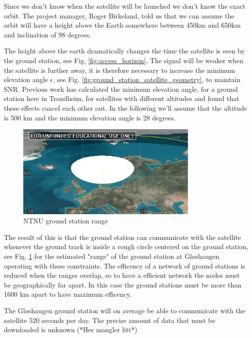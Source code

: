 Since we don't know when the satellite will be launched we don't know the exact orbit. The project manager, Roger Birkeland, told us that we can assume the orbit will  have a height above the Earth somewhere between 450km and 650km and inclination of 98 degrees.

The height above the earth dramatically changes the time the satellite is seen by the ground station, see Fig. \ref{fig:access_horizon}. The signal will be weaker when the satellite is further away, it is therefore necessary to increase the minimum elevation angle $\epsilon$, see Fig. \ref{fig:ground_station_satellite_geometry}, to maintain SNR.  Previous work\cite{antennemaster}\cite{bildemaster} has calculated the minimum elevation angle, for a ground station here in Trondheim, for satellites with different altitudes and found that these effects cancel each other out. In the following we'll assume that the altitude is 500 km and the minimum elevation angle is 28 degrees.

\begin{figure}
  \begin{center}
    \includegraphics[width=0.8\textwidth]{Figures/ntnu_footprint}
  \end{center}
  \caption[ntnu footprint]{NTNU ground station range}
  \label{fig:ntnu_range}
\end{figure}

The result of this is that the ground station can communicate with the satellite whenever the ground track is inside a rough circle centered on the ground station, see Fig. \ref{fig:ntnu_range} for the estimated "range" of the ground station at Gløshaugen operating with these constraints. The efficency of a network of ground stations is reduced when the ranges overlap, so to have a efficient network the nodes must be geographically far apart. In this case the ground stations must be more than 1600 km apart to have maximum efficency.

The Gløshaugen ground station will on average be able to communicate with the satellite 520 seconds per day. The precise amount of data that must be downloaded is unknown (*Her mangler litt*)

